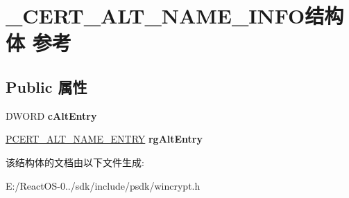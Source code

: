 \hypertarget{struct___c_e_r_t___a_l_t___n_a_m_e___i_n_f_o}{}\section{\+\_\+\+C\+E\+R\+T\+\_\+\+A\+L\+T\+\_\+\+N\+A\+M\+E\+\_\+\+I\+N\+F\+O结构体 参考}
\label{struct___c_e_r_t___a_l_t___n_a_m_e___i_n_f_o}
\subsection*{Public 属性}
\begin{DoxyCompactItemize}
\item 
\mbox{\label{struct___c_e_r_t___a_l_t___n_a_m_e___i_n_f_o_a7592bb0dc8b74855ef2531dc5e71d182}} 
D\+W\+O\+RD {\bfseries c\+Alt\+Entry}
\item 
\mbox{\label{struct___c_e_r_t___a_l_t___n_a_m_e___i_n_f_o_a59b024332ca8027c61c76259c7cdf1fc}} 
\hyperlink{struct___c_e_r_t___a_l_t___n_a_m_e___e_n_t_r_y}{P\+C\+E\+R\+T\+\_\+\+A\+L\+T\+\_\+\+N\+A\+M\+E\+\_\+\+E\+N\+T\+RY} {\bfseries rg\+Alt\+Entry}
\end{DoxyCompactItemize}


该结构体的文档由以下文件生成\+:\begin{DoxyCompactItemize}
\item 
E\+:/\+React\+O\+S-\/0../sdk/include/psdk/wincrypt.\+h\end{DoxyCompactItemize}
